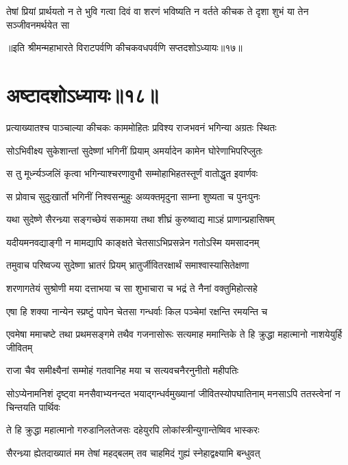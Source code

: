 \twolineshloka
{तेषां प्रियां प्रार्थयतो न ते भुवि गत्वा दिवं वा शरणं भविष्यति}
{न वर्तते कीचक ते दृशा शुभं या तेन सञ्जीवनमर्थयेत सा}

॥इति श्रीमन्महाभारते विराटपर्वणि कीचकवधपर्वणि सप्तदशोऽध्यायः॥१७॥

\chapter{अष्टादशोऽध्यायः॥१८॥}

\twolineshloka
{प्रत्याख्यातश्च पाञ्चाल्या कीचकः काममोहितः}
{प्रविश्य राजभवनं भगिन्या अग्रतः स्थितः}


\twolineshloka
{सोऽभिवीक्ष्य सुकेशान्तां सुदेष्णां भगिनीं प्रियाम्}
{अमर्यादेन कामेन घोरेणाभिपरिप्लुतः}


\twolineshloka
{स तु मूर्ध्न्यञ्जलिं कृत्वा भगिन्याश्चरणावुभौ}
{सम्मोहाभिहतस्तूर्णं वातोद्धृत इवार्णवः}


\twolineshloka
{स प्रोवाच सुदुःखार्तो भगिनीं निश्वसन्मुहुः}
{अव्यक्तमृदुना साम्ना शुष्यता च पुनःपुनः}


\twolineshloka
{यथा सुदेष्णे सैरन्ध्र्या सङ्गच्छेयं सकामया}
{तथा शीघ्रं कुरुष्वाद्य माऽहं प्राणान्प्रहासिषम्}


\twolineshloka
{यदीयमनवद्याङ्गी न मामद्यापि काङ्क्षते}
{चेतसाऽभिप्रसन्नेन गतोऽस्मि यमसादनम्}



\twolineshloka
{तमुवाच परिष्वज्य सुदेष्णा भ्रातरं प्रियम्}
{भ्रातुर्जीवितरक्षार्थं समाश्वास्यासितेक्षणा}


\twolineshloka
{शरणागतेयं सुश्रोणी मया दत्ताभया च सा}
{शुभाचारा च भद्रं ते नैनां वक्तुमिहोत्सहे}


\twolineshloka
{एषा हि शक्या नान्येन स्प्रष्टुं पापेन चेतसा}
{गन्धर्वाः किल पञ्चेमां रक्षन्ति रमयन्ति च}


\threelineshloka
{एवमेषा ममाचष्टे तथा प्रथमसङ्गमे}
{तथैव गजनासोरूः सत्यमाह ममान्तिके}
{ते हि क्रुद्धा महात्मानो नाशयेयुर्हि जीवितम्}


\twolineshloka
{राजा चैव समीक्ष्यैनां सम्मोहं गतवानिह}
{मया च सत्यवचनैरनुनीतो महीपतिः}


\threelineshloka
{सोऽप्येनामनिशं दृष्ट्वा मनसैवाभ्यनन्दत}
{भयाद्गन्धर्वमुख्यानां जीवितस्योपघातिनाम्}
{मनसाऽपि ततस्त्वेनां न चिन्तयति पार्थिवः}


\twolineshloka
{ते हि क्रुद्धा महात्मानो गरुडानिलतेजसः}
{दहेयुरपि लोकांस्त्रीन्युगान्तेष्विव भास्करः}


\twolineshloka
{सैरन्ध्र्या ह्येतदाख्यातं मम तेषां महद्बलम्}
{तव चाहमिदं गुह्यं स्नेहाद्वक्ष्यामि बन्धुवत्}


